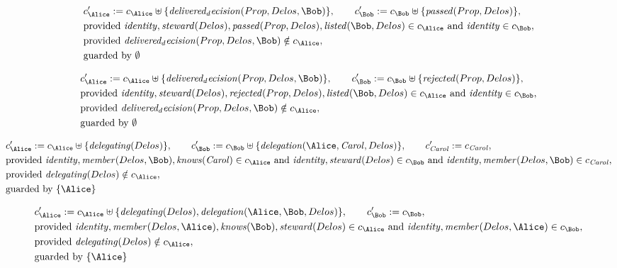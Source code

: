 \begin{align*}
&
c'_
{
\Alice
}
 := 
c_
{
\Alice
}
 \uplus 
\{
\mathit{
delivered_decision
}
(
Prop
,
Delos
,
\Bob
)
\}
, \qquad 
c'_
{
\Bob
}
 := 
c_
{
\Bob
}
 \uplus 
\{
\mathit{
passed
}
(
Prop
,
Delos
)
\}
,\\
&
\text{provided } 
\mathit{
identity
}
,
\mathit{
steward
}
(
Delos
)
,
\mathit{
passed
}
(
Prop
,
Delos
)
,
\mathit{
listed
}
(
\Bob
,
Delos
)
 \in c_
{
\Alice
}
 \text{ and } 
\mathit{
identity
}
 \in c_
{
\Bob
}
,\\
&
\text{provided } 
\mathit{
delivered_decision
}
(
Prop
,
Delos
,
\Bob
)
 \notin c_
{
\Alice
}
,\\
&
\text{guarded by } \emptyset
\end{align*}

\begin{align*}
&
c'_
{
\Alice
}
 := 
c_
{
\Alice
}
 \uplus 
\{
\mathit{
delivered_decision
}
(
Prop
,
Delos
,
\Bob
)
\}
, \qquad 
c'_
{
\Bob
}
 := 
c_
{
\Bob
}
 \uplus 
\{
\mathit{
rejected
}
(
Prop
,
Delos
)
\}
,\\
&
\text{provided } 
\mathit{
identity
}
,
\mathit{
steward
}
(
Delos
)
,
\mathit{
rejected
}
(
Prop
,
Delos
)
,
\mathit{
listed
}
(
\Bob
,
Delos
)
 \in c_
{
\Alice
}
 \text{ and } 
\mathit{
identity
}
 \in c_
{
\Bob
}
,\\
&
\text{provided } 
\mathit{
delivered_decision
}
(
Prop
,
Delos
,
\Bob
)
 \notin c_
{
\Alice
}
,\\
&
\text{guarded by } \emptyset
\end{align*}

\begin{align*}
&
c'_
{
\Alice
}
 := 
c_
{
\Alice
}
 \uplus 
\{
\mathit{
delegating
}
(
Delos
)
\}
, \qquad 
c'_
{
\Bob
}
 := 
c_
{
\Bob
}
 \uplus 
\{
\mathit{
delegation
}
(
\Alice
,
\mathit{Carol}
,
Delos
)
\}
, \qquad 
c'_
{
\mathit{Carol}
}
 := 
c_
{
\mathit{Carol}
}
,\\
&
\text{provided } 
\mathit{
identity
}
,
\mathit{
member
}
(
Delos
,
\Bob
)
,
\mathit{
knows
}
(
\mathit{Carol}
)
 \in c_
{
\Alice
}
 \text{ and } 
\mathit{
identity
}
,
\mathit{
steward
}
(
Delos
)
 \in c_
{
\Bob
}
 \text{ and } 
\mathit{
identity
}
,
\mathit{
member
}
(
Delos
,
\Bob
)
 \in c_
{
\mathit{Carol}
}
,\\
&
\text{provided } 
\mathit{
delegating
}
(
Delos
)
 \notin c_
{
\Alice
}
,\\
&
\text{guarded by } \{
\Alice
\}
\end{align*}

\begin{align*}
&
c'_
{
\Alice
}
 := 
c_
{
\Alice
}
 \uplus 
\{
\mathit{
delegating
}
(
Delos
)
,
\mathit{
delegation
}
(
\Alice
,
\Bob
,
Delos
)
\}
, \qquad 
c'_
{
\Bob
}
 := 
c_
{
\Bob
}
,\\
&
\text{provided } 
\mathit{
identity
}
,
\mathit{
member
}
(
Delos
,
\Alice
)
,
\mathit{
knows
}
(
\Bob
)
,
\mathit{
steward
}
(
Delos
)
 \in c_
{
\Alice
}
 \text{ and } 
\mathit{
identity
}
,
\mathit{
member
}
(
Delos
,
\Alice
)
 \in c_
{
\Bob
}
,\\
&
\text{provided } 
\mathit{
delegating
}
(
Delos
)
 \notin c_
{
\Alice
}
,\\
&
\text{guarded by } \{
\Alice
\}
\end{align*}
